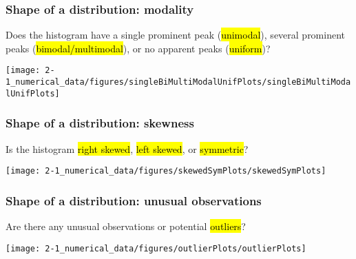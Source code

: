 
\begin{frame}
\frametitle{Shape of a distribution: modality}

Does the histogram have a single prominent peak (\hl{unimodal}), several prominent peaks (\hl{bimodal/multimodal}), or no apparent peaks (\hl{uniform})?

\begin{center}
\texttt{[image: 2-1\_numerical\_data/figures/singleBiMultiModalUnifPlots/singleBiMultiModalUnifPlots]}
\end{center}


\end{frame}


\begin{frame}
\frametitle{Shape of a distribution: skewness}

Is the histogram \hl{right skewed}, \hl{left skewed}, or \hl{symmetric}?

\begin{center}
\texttt{[image: 2-1\_numerical\_data/figures/skewedSymPlots/skewedSymPlots]}
\end{center}


\end{frame}


\begin{frame}
\frametitle{Shape of a distribution: unusual observations}

Are there any unusual observations or potential \hl{outliers}?

\begin{center}
\texttt{[image: 2-1\_numerical\_data/figures/outlierPlots/outlierPlots]}
\end{center}

\end{frame}



